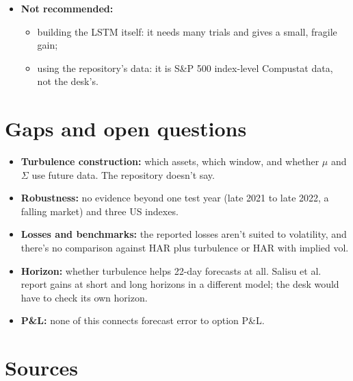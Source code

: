 \documentclass{article}
\begin{document}
\begin{itemize}
\item \textbf{Not recommended:}

\begin{itemize}

\item building the LSTM itself: it needs many trials and gives a small, fragile gain;

\item using the repository's data: it is S\&P 500 index-level Compustat data, not the desk's.

\end{itemize}

\end{itemize}

\section{Gaps and open questions}

\begin{itemize}

\item \textbf{Turbulence construction:} which assets, which window, and whether $\mu$ and $\Sigma$ use future data. The repository doesn't say.

\item \textbf{Robustness:} no evidence beyond one test year (late 2021 to late 2022, a falling market) and three US indexes.

\item \textbf{Losses and benchmarks:} the reported losses aren't suited to volatility, and there's no comparison against HAR plus turbulence or HAR with implied vol.

\item \textbf{Horizon:} whether turbulence helps 22-day forecasts at all. Salisu et al. report gains at short and long horizons in a different model; the desk would have to check its own horizon.

\item \textbf{P\&L:} none of this connects forecast error to option P\&L.

\end{itemize}

\section{Sources}
\end{document}
